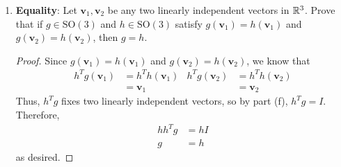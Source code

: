 \documentclass[../psets.tex]{subfiles}
\begin{document}
\begin{enumerate}
\begin{enumerate}
\begin{proof}
            In other words, if $g$ fixes $\mathbf{v}_1,\mathbf{v}_2$, then it fixes all linear combinations of them as well.\par
            Taking the hint, let $\mathbf{u}_1=\mathbf{v_1}/|\mathbf{v}_1|$. Define $\mathbf{u}_2$ from $\mathbf{v}_2$ as in part (e), and define $\mathbf{u}_3$ from some third linearly independent vector as in part (e). By the construction of $\mathbf{u}_1,\mathbf{u}_2$, we know that $\mathbf{u}_1,\mathbf{u}_2\in\spn(\mathbf{v}_1,\mathbf{v}_2)$. Thus, $g$ fixes $\mathbf{u}_1,\mathbf{u}_2$. This combined with part (e) shows that
            \begin{equation*}
                1\mathbf{u}_2+0\mathbf{u}_3 = \mathbf{u}_2
                = g\mathbf{u}_2
                = a\mathbf{u}_2+b\mathbf{u}_3
            \end{equation*}
            i.e., that $a=1$ and $b=0$. Thus,
            \begin{equation*}
                g\mathbf{u}_3 = -b\mathbf{u}_2+a\mathbf{u}_3
                = 0\mathbf{u}_2+1\mathbf{u}_3
                = \mathbf{u}_3
            \end{equation*}
            i.e., $g$ fixes $\mathbf{u}_3$ as well. Since $g$ fixes a basis of $\R^3$, $g$ must be the identity on $\R^3$, as desired.
        \end{proof}
        \item \textbf{Equality}: Let $\mathbf{v}_1,\mathbf{v}_2$ be any two linearly independent vectors in $\R^3$. Prove that if $g\in\text{SO}(3)$ and $h\in\text{SO}(3)$ satisfy $g(\mathbf{v}_1)=h(\mathbf{v}_1)$ and $g(\mathbf{v}_2)=h(\mathbf{v}_2)$, then $g=h$.
        \begin{proof}
            Since $g(\mathbf{v}_1)=h(\mathbf{v}_1)$ and $g(\mathbf{v}_2)=h(\mathbf{v}_2)$, we know that
            \begin{align*}
                h^Tg(\mathbf{v}_1) &= h^Th(\mathbf{v}_1)&
                    h^Tg(\mathbf{v}_2) &= h^Th(\mathbf{v}_2)\\
                &= \mathbf{v}_1&
                    &= \mathbf{v}_2
            \end{align*}
            Thus, $h^Tg$ fixes two linearly independent vectors, so by part (f), $h^Tg=I$. Therefore,
            \begin{align*}
                hh^Tg &= hI\\
                g &= h
            \end{align*}
            as desired.
        \end{proof}

\end{enumerate}
\end{enumerate}
\end{document}
